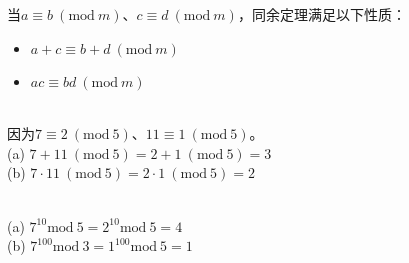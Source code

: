 \vspace{0.5cm}

当$ a \equiv b\ (\text{mod}\ m) $、$ c \equiv d\ (\text{mod}\ m) $，同余定理满足以下性质：

\begin{itemize}
    \item $ a + c \equiv b + d\ (\text{mod}\ m) $
    \item $ ac \equiv bd\ (\text{mod}\ m) $
\end{itemize}

\vspace{0.5cm}

\begin{tcolorbox}
    \\
    因为$ 7 \equiv 2\ (\text{mod}\ 5) $、$ 11 \equiv 1\ (\text{mod}\ 5) $。\\
    (a) $ 7 + 11\ (\text{mod}\ 5) = 2 + 1 \ (\text{mod}\ 5) = 3 $\\
    (b) $ 7 \cdot 11\ (\text{mod}\ 5) = 2 \cdot 1 \ (\text{mod}\ 5) = 2 $
\end{tcolorbox}

\vspace{0.5cm}

\begin{tcolorbox}
    \\
    (a) $ 7^{10} \text{mod}\ 5 = 2^{10} \text{mod}\ 5 = 4 $\\
    (b) $ 7^{100} \text{mod}\ 3 = 1^{100} \text{mod}\ 5 = 1 $
\end{tcolorbox}

\newpage
